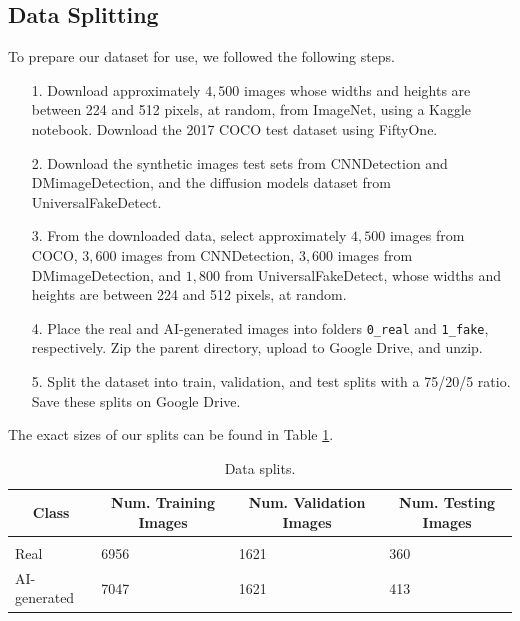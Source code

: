 \documentclass{article} %
\begin{document}
\subsection{Data Splitting}

To prepare our dataset for use, we followed the following steps.
\begin{enumerate}
    \item[1.] Download approximately $4,500$ images whose widths and heights are between 224 and 512 pixels, at random, from ImageNet, using a Kaggle notebook. Download the 2017 COCO test dataset using FiftyOne.
    \item[2.] Download the synthetic images test sets from CNNDetection and DMimageDetection, and the diffusion models dataset from UniversalFakeDetect.
    \item[3.] From the downloaded data, select approximately $4,500$ images from COCO, $3,600$ images from CNNDetection, $3,600$ images from DMimageDetection, and $1,800$ from UniversalFakeDetect, whose widths and heights are between 224 and 512 pixels, at random.
    \item[4.] Place the real and AI-generated images into folders \texttt{0\_real} and \texttt{1\_fake}, respectively. Zip the parent directory, upload to Google Drive, and unzip.
    \item[5.] Split the dataset into train, validation, and test splits with a 75/20/5 ratio. Save these splits on Google Drive.
\end{enumerate}

The exact sizes of our splits can be found in Table \ref{data_splits}.

\begin{table}[t]
    \caption{Data splits.}
    \label{data_splits}
    \begin{center}
        \begin{tabular}{llll}
            \multicolumn{1}{c}{\bf Class} & \multicolumn{1}{c}{\bf Num. Training Images} & \multicolumn{1}{c}{\bf Num. Validation Images} & \multicolumn{1}{c}{\bf Num. Testing Images}
            \\ \hline \\
            Real                          & 6956                                         & 1621                                           & 360                                         \\
            AI-generated                  & 7047                                         & 1621                                           & 413                                         \\
        \end{tabular}
    \end{center}
\end{table}
\end{document}
